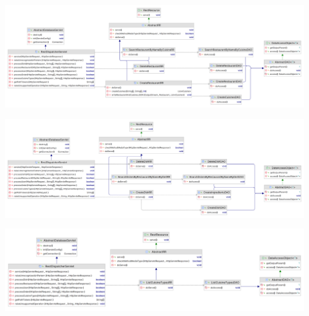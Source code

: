 \begin{center}
    \includegraphics[width=1.0\textwidth]{resources/class-diagrams/restaurant_class_diagram}
    \label{fig:class-restaurant}
\end{center}


\begin{center}
    \includegraphics[width=1.0\textwidth]{resources/class-diagrams/dish_class_diagram}
    \label{fig:class-dish}
\end{center}


\begin{center}
    \includegraphics[width=1.0\textwidth]{resources/class-diagrams/cuisine_class_diagram}
    \label{fig:class-cuisine}
\end{center}


